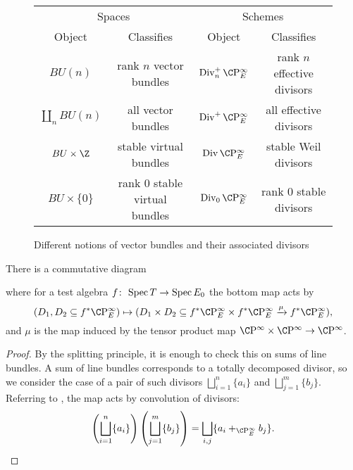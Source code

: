 \begin{figure}
\begin{center}
\begin{tabular}{@{}cccc@{}} \toprule
\multicolumn{2}{c}{Spaces} &
\multicolumn{2}{c}{Schemes}
\\
\cmidrule(r){1-2}
\cmidrule(r){3-4}
Object & Classifies & Object & Classifies \\ \midrule
\(BU(n)\) & rank \(n\) vector bundles & \(\Div_n^+ \CP^\infty_E\) & rank \(n\) effective divisors \\
\(\coprod_n BU(n)\) & all vector bundles & \(\Div^+ \CP^\infty_E\) & all effective divisors \\
\(BU \times \Z\) & stable virtual bundles & \(\Div \CP^\infty_E\) & stable Weil divisors \\
\(BU \times \{0\}\) & rank \(0\) stable virtual bundles & \(\Div_0 \CP^\infty_E\) & rank \(0\) stable divisors \\ \bottomrule
\end{tabular}
\end{center}
\caption{Different notions of vector bundles and their associated divisors}
\end{figure}

\begin{corollary}\label{ProductMapOfDivisorSchemes}
There is a commutative diagram
\begin{center}
\end{center}
where for a test algebra \(f \colon\thinspace \operatorname{Spec} T \to \operatorname{Spec} E_0\) the bottom map acts by \[(D_1, D_2 \subseteq f^* \CP^\infty_E) \mapsto (D_1 \times D_2 \subseteq f^* \CP^\infty_E \times f^* \CP^\infty_E \xrightarrow{\mu} f^* \CP^\infty_E),\] and \(\mu\) is the map induced by the tensor product map \(\CP^\infty \times \CP^\infty \to \CP^\infty\).
\end{corollary}
\begin{proof}
By the splitting principle, it is enough to check this on sums of line bundles.  A sum of line bundles corresponds to a totally decomposed divisor, so we consider the case of a pair of such divisors \(\bigsqcup_{i=1}^n \{a_i\}\) and \(\bigsqcup_{j=1}^m \{b_j\}\).  Referring to , the map acts by convolution of divisors: \[\left(\bigsqcup_{i=1}^n \{a_i\} \right) \left( \bigsqcup_{j=1}^m \{b_j\} \right) = \bigsqcup_{i, j} \{a_i +_{\CP^\infty_E} b_j\}. \qedhere\]
\end{proof}

